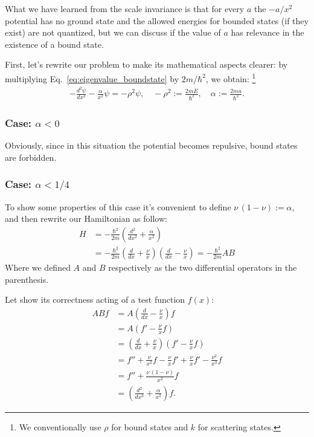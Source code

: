 \vspace{4mm}
\noindent
What we have learned from the scale invariance is that for every $a$ the $-a/x^2$ potential has no ground state and the allowed energies for bounded states (if they exist) are not quantized, but we can discuss if the value of $a$ has relevance in the existence of a bound state.

First, let's rewrite our problem to make its mathematical aspects clearer: by multiplying Eq.~\eqref{eq:eigenvalue_boundstate} by $2m/\hbar^2$, we obtain:
\footnote{We conventionally use \(\rho\) for bound states and \(k\) for scattering states.}
\begin{align}
    - \frac{d^2\psi}{dx^2} - \frac{\alpha}{x^2}\psi = - \rho^2 \psi, \quad  -\rho^2 := \frac{2mE}{\hbar^2}, \quad \alpha := \frac{2ma}{\hbar^2}.
    \label{eq:eigenvalue_boundstate_alpha}
\end{align}

\subsubsection{Case: \(\alpha < 0\)}
Obviously, since in this situation the potential becomes repulsive, bound states are forbidden.

\subsubsection{Case: \(\alpha < 1/4\)}

To show some properties of this case it's convenient to define $\nu \, (1-\nu) := \alpha$, and then rewrite our Hamiltonian as follow:
\begin{align*}
    H & = - \frac{\hbar^2}{2m} \left(\frac{d^2}{dx^2} + \frac{\alpha}{x^2}\right) \\
      & = - \frac{\hbar^2}{2m} \left( \frac{d}{dx} + \frac{\nu}{x} \right) \left( \frac{d}{dx} - \frac{\nu}{x} \right) = - \frac{\hbar^2}{2m} A B
\end{align*}
Where we defined $A$ and $ B $ respectively as the two differential operators in the parenthesis.

Let show its correctness acting of a test function $f(x)$:
\begin{align*}
    A B f
     & = A \left( \frac{d}{dx} - \frac{\nu}{x} \right) f                                     \\
     & = A \left( f' - \frac{\nu}{x} f \right)                                               \\
     & = \left( \frac{d}{dx} + \frac{\nu}{x} \right) \left( f' - \frac{\nu}{x}f \right)      \\
     & = f'' + \frac{\nu}{x^2} f - \frac{\nu}{x} f' + \frac{\nu}{x} f' - \frac{\nu^2}{x^2} f \\
     & = f'' + \frac{\nu \, (1-\nu)}{x^2} f                                                  \\
     & = \left( \frac{d^2}{dx^2} + \frac{\alpha}{x^2} \right) f .
\end{align*}

